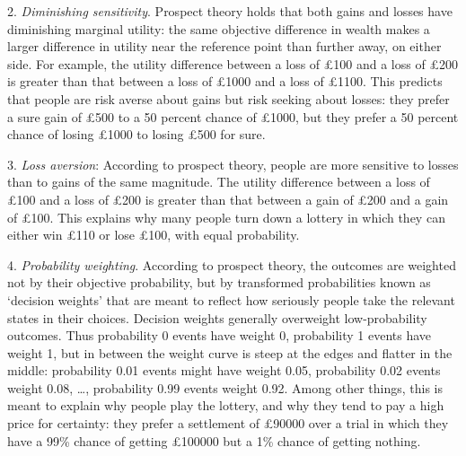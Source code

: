 2. \emph{Diminishing sensitivity}. Prospect theory holds that both gains and
losses have diminishing marginal utility: the same objective difference in
wealth makes a larger difference in utility near the reference point than
further away, on either side. For example, the utility difference between a loss
of £100 and a loss of £200 is greater than that between a loss of £1000 and a
loss of £1100. This predicts that people are risk averse about gains but risk
seeking about losses: they prefer a sure gain of £500 to a 50 percent chance of
£1000, but they prefer a 50 percent chance of losing £1000 to losing £500 for
sure.

3. \emph{Loss aversion}: According to prospect theory, people are more sensitive
to losses than to gains of the same magnitude. The utility difference between a
loss of £100 and a loss of £200 is greater than that between a gain of £200 and
a gain of £100. This explains why many people turn down a lottery in which they
can either win £110 or lose £100, with equal probability.

4. \emph{Probability weighting}. According to prospect theory, the outcomes are
weighted not by their objective probability, but by transformed probabilities
known as `decision weights' that are meant to reflect how seriously people take
the relevant states in their choices. Decision weights generally overweight
low-probability outcomes. Thus probability 0 events have weight 0, probability 1
events have weight 1, but in between the weight curve is steep at the edges and
flatter in the middle: probability 0.01 events might have weight 0.05,
probability 0.02 events weight 0.08, \ldots, probability 0.99 events weight
0.92. Among other things, this is meant to explain why people play the lottery,
and why they tend to pay a high price for certainty: they prefer a settlement of
£90000 over a trial in which they have a 99\% chance of getting £100000 but a
1\% chance of getting nothing.%

